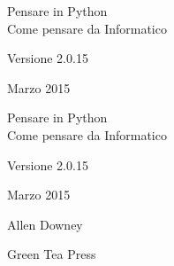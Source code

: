 \documentclass[10pt]{book}
\newcommand{\theversion}{2.0.15}
\newcommand{\thedate}{Marzo 2015}
\begin{document}
\begin{latexonly}

\renewcommand{\blankpage}{\thispagestyle{empty} \quad \newpage}



\thispagestyle{empty}

\begin{flushright}
\vspace*{2.0in}

\begin{spacing}{3}
{\huge Pensare in Python}\\
{\Large Come pensare da Informatico}
\end{spacing}

\vspace{0.25in}

Versione \theversion

\thedate

\vfill

\end{flushright}


\blankpage
\blankpage

\pagebreak
\thispagestyle{empty}

\begin{flushright}
\vspace*{2.0in}

\begin{spacing}{3}
{\huge Pensare in Python}\\
{\Large Come pensare da Informatico}
\end{spacing}

\vspace{0.25in}

Versione \theversion

\thedate

\vspace{1in}


{\Large
Allen Downey\\
}


\vspace{0.5in}

{\Large Green Tea Press}


\end{flushright}
\end{latexonly}
\end{document}
